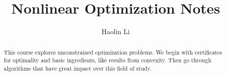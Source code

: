 \documentclass[a4paper]{report}
\author{Haolin Li}
\title{Nonlinear Optimization Notes}
\begin{document}
\maketitle

\begin{abstract}
	This course explores unconstrained optimization problems. We begin with certificates for optimality and basic ingredients, like results from convexity. Then go through algorithms that have great impact over this field of study. 
\end{abstract}

\newpage

\tableofcontents



\newpage

\newpage
\printbibliography
\end{document}
